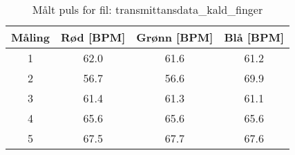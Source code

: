 
\begin{table}[H]
\centering
\caption{Målt puls for fil: transmittansdata\_kald\_finger}
\label{tab:transmittansdata\_kald\_finger}
\begin{tabular}{|c|c|c|c|}
\hline
\textbf{Måling} & \textbf{Rød [BPM]} & \textbf{Grønn [BPM]} & \textbf{Blå [BPM]} \\ \hline
1 & 62.0 & 61.6 & 61.2 \\ \hline
2 & 56.7 & 56.6 & 69.9 \\ \hline
3 & 61.4 & 61.3 & 61.1 \\ \hline
4 & 65.6 & 65.6 & 65.6 \\ \hline
5 & 67.5 & 67.7 & 67.6 \\ \hline
\end{tabular}
\end{table}

